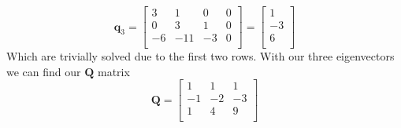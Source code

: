 \documentclass{article}
\begin{document}
$$
\mathbf{q}_3
=
\left[
\begin{array}{ccc|c}
3 & 1 & 0  & 0\\
0 & 3 & 1  & 0\\
-6&-11& -3 & 0\\
\end{array}
\right]
=
\begin{bmatrix}
1 \\
-3 \\
6 \\
\end{bmatrix}
$$
Which are trivially solved due to the first two rows.
With our three eigenvectors we can find our $\mathbf{Q}$ matrix
$$
\mathbf{Q}
=
\begin{bmatrix}
1 & 1 & 1 \\
-1&-2 &-3 \\
1 & 4 & 9 \\
\end{bmatrix}
$$
\end{document}

